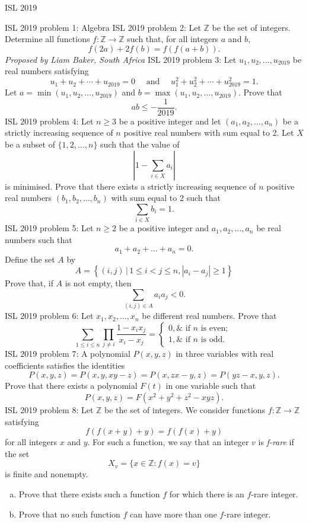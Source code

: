 ISL 2019 

ISL 2019 problem 1:  Algebra 
ISL 2019 problem 2:  Let $\mathbb{Z}$ be the set of integers. Determine all functions $f: \mathbb{Z} \rightarrow \mathbb{Z}$ such that, for all integers $a$ and $b$,
\[ f(2a)+2f(b)=f(f(a+b)). \]
\textit{Proposed by Liam Baker, South Africa} 
ISL 2019 problem 3:  Let $u_1, u_2, \dots, u_{2019}$ be real numbers satisfying
\[ u_1+u_2+\cdots+u_{2019}=0 \quad \text { and } \quad u_1^2+u_2^2+\cdots+u_{2019}^2=1. \]
Let $a=\min \left(u_1, u_2, \ldots, u_{2019}\right)$ and $b=\max \left(u_1, u_2, \ldots, u_{2019}\right)$. Prove that
\[ a b \leqslant-\frac{1}{2019}. \] 
ISL 2019 problem 4:  Let $n \geqslant 3$ be a positive integer and let $\left(a_1, a_2, \ldots, a_n\right)$ be a strictly increasing sequence of $n$ positive real numbers with sum equal to 2. Let $X$ be a subset of $\{1,2, \ldots, n\}$ such that the value of
\[ \left|1-\sum_{i \in X} a_i\right| \]
is minimised. Prove that there exists a strictly increasing sequence of $n$ positive real numbers $\left(b_1, b_2, \ldots, b_n\right)$ with sum equal to 2 such that
\[ \sum_{i \in X} b_i=1. \] 
ISL 2019 problem 5:  Let $n\geqslant 2$ be a positive integer and $a_1,a_2, \ldots ,a_n$ be real numbers such that
\[ a_1+a_2+\dots+a_n=0. \]
Define the set $A$ by
\[ A=\left\{(i, j)\,|\,1 \leqslant i<j \leqslant n,\left|a_i-a_j\right| \geqslant 1\right\} \]
Prove that, if $A$ is not empty, then
\[ \sum_{(i, j) \in A} a_i a_j<0. \] 
ISL 2019 problem 6:  Let $x_1, x_2, \dots, x_n$ be different real numbers. Prove that
\[
\sum_{1 \leqslant i \leqslant n} \prod_{j \neq i} \frac{1-x_i x_j}{x_i-x_j}=\left\{
\begin{array}{ll}
0, \& \text { if } n \text { is even; } \\
1, \& \text { if } n \text { is odd. }
\end{array}
\right.
\] 
ISL 2019 problem 7:  A polynomial $P(x, y, z)$ in three variables with real coefficients satisfies the identities
\[ P(x, y, z)=P(x, y, xy-z)=P(x, zx-y, z)=P(yz-x, y, z). \]
Prove that there exists a polynomial $F(t)$ in one variable such that
\[ P(x,y,z)=F(x^2+y^2+z^2-xyz). \] 
ISL 2019 problem 8:  Let $\mathbb Z$ be the set of integers. We consider functions $f :\mathbb Z\to\mathbb Z$ satisfying
\[ f\left(f(x+y)+y\right)=f\left(f(x)+y\right) \]
for all integers $x$ and $y$. For such a function, we say that an integer $v$ is \textit{f-rare} if the set
\[ X_v=\{x\in\mathbb Z:f(x)=v\} \]
is finite and nonempty.
\begin{enumerate}[(a)]
  \item Prove that there exists such a function $f$ for which there is an $f$-rare integer.
  \item Prove that no such function $f$ can have more than one $f$-rare integer.
\end{enumerate}
